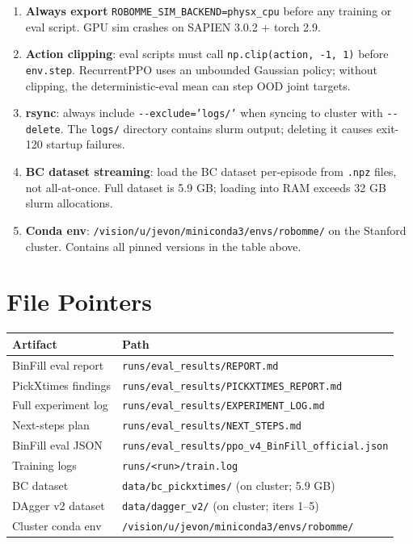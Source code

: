 \documentclass[11pt,letterpaper]{article}
\begin{document}
\begin{enumerate}
  \item \textbf{Always export} \texttt{ROBOMME\_SIM\_BACKEND=physx\_cpu} before
        any training or eval script. GPU sim crashes on SAPIEN 3.0.2 + torch 2.9.

  \item \textbf{Action clipping}: eval scripts must call
        \texttt{np.clip(action, -1, 1)} before \texttt{env.step}.
        RecurrentPPO uses an unbounded Gaussian policy; without clipping, the
        deterministic-eval mean can step OOD joint targets.

  \item \textbf{rsync}: always include \texttt{-{}-exclude='logs/'} when syncing
        to cluster with \texttt{-{}-delete}. The \texttt{logs/} directory
        contains slurm output; deleting it causes exit-120 startup failures.

  \item \textbf{BC dataset streaming}: load the BC dataset per-episode from
        \texttt{.npz} files, not all-at-once. Full dataset is 5.9 GB; loading
        into RAM exceeds 32 GB slurm allocations.

  \item \textbf{Conda env}: \texttt{/vision/u/jevon/miniconda3/envs/robomme/}
        on the Stanford cluster. Contains all pinned versions in the table above.
\end{enumerate}

\appendix

\section{File Pointers}
\label{app:files}

\begin{table}[H]
\centering
\begin{tabular}{ll}
\toprule
\textbf{Artifact} & \textbf{Path} \\
\midrule
BinFill eval report & \texttt{runs/eval\_results/REPORT.md} \\
PickXtimes findings & \texttt{runs/eval\_results/PICKXTIMES\_REPORT.md} \\
Full experiment log & \texttt{runs/eval\_results/EXPERIMENT\_LOG.md} \\
Next-steps plan & \texttt{runs/eval\_results/NEXT\_STEPS.md} \\
BinFill eval JSON & \texttt{runs/eval\_results/ppo\_v4\_BinFill\_official.json} \\
Training logs & \texttt{runs/<run>/train.log} \\
BC dataset & \texttt{data/bc\_pickxtimes/} (on cluster; 5.9 GB) \\
DAgger v2 dataset & \texttt{data/dagger\_v2/} (on cluster; iters 1–5) \\
Cluster conda env & \texttt{/vision/u/jevon/miniconda3/envs/robomme/} \\
\bottomrule
\end{tabular}
\end{table}
\end{document}
